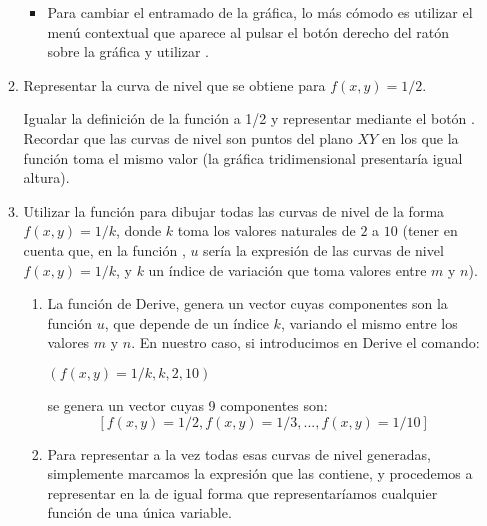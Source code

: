 \begin{enumerate}[leftmargin=*]
\begin{enumerate}
\begin{indication}
{\begin{enumerate}
\begin{itemize}
\item Para cambiar el entramado de la gráfica, lo más cómodo es
utilizar el menú contextual que aparece al pulsar el botón derecho
del ratón sobre la gráfica y utilizar .
\end{itemize}

\end{enumerate}

}
\end{indication}

  \item Representar la curva de nivel que se obtiene para
  $f(x,y)=1/2$.

\begin{indication}
{Igualar la definición de la función a 1/2 y representar mediante el
botón . Recordar que las curvas de nivel son
puntos del plano $XY$ en los que la función toma el mismo valor (la
gráfica tridimensional presentaría igual altura).

}
\end{indication}


  \item Utilizar la función  para dibujar todas las
  curvas de nivel de la forma $f(x,y) = 1/k$, donde $k$ toma los
  valores naturales de $2$ a $10$ (tener en cuenta que, en la función ,
  $u$ sería la expresión de las curvas de nivel $f(x,y) = 1/k$, y
$k$ un índice de variación que toma valores entre $m$ y $n$).

\begin{indication}
{

\begin{enumerate}

\item La función  de Derive, genera un
vector cuyas componentes son la función $u$, que depende de un
índice $k$, variando el mismo entre los valores $m$ y $n$. En
nuestro caso, si introducimos en Derive el comando:

\begin{center}
$(f(x,y)=1/k,k,2,10)$
\end{center}

se genera un vector cuyas 9 componentes son:
\[
[f(x,y)=1/2,f(x,y)=1/3,...,f(x,y)=1/10]
\]

\item Para representar a la vez todas esas curvas de nivel
generadas, simplemente marcamos la expresión que las contiene, y
procedemos a representar en la  de igual forma que
representaríamos cualquier función de una única variable.
\end{enumerate}

}
\end{indication}
\end{enumerate}
\end{enumerate}
